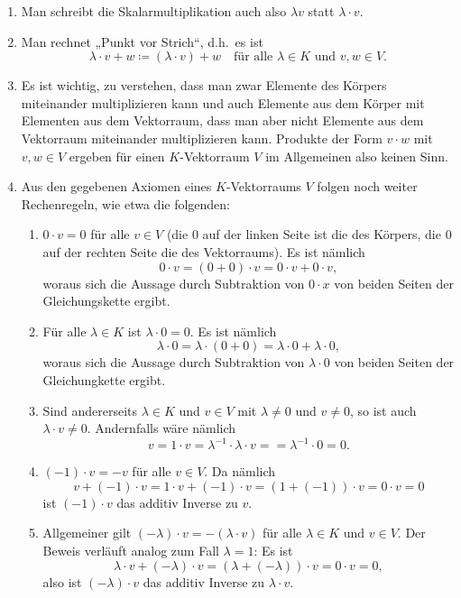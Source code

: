 \begin{bem}
 \begin{enumerate}[leftmargin=*]
  \item
   Man schreibt die Skalarmultiplikation auch also $\lambda v$ statt $\lambda \cdot v$.
  \item
   Man rechnet „Punkt vor Strich“, d.h.\ es ist
   \[
    \lambda \cdot v + w \coloneqq (\lambda \cdot v) + w
    \quad\text{für alle $\lambda \in K$ und $v,w \in V$}.
   \]
  \item
   Es ist wichtig, zu verstehen, dass man zwar Elemente des Körpers miteinander multiplizieren kann und auch Elemente aus dem Körper mit Elementen aus dem Vektorraum, dass man aber nicht Elemente aus dem Vektorraum miteinander multiplizieren kann. Produkte der Form $v \cdot w$ mit $v,w \in V$ ergeben für einen $K$-Vektorraum $V$ im Allgemeinen also keinen Sinn.
  \item
   Aus den gegebenen Axiomen eines $K$-Vektorraums $V$ folgen noch weiter Rechenregeln, wie etwa die folgenden:
   \begin{enumerate}[label=\alph*)]
    \item
     $0 \cdot v = 0$ für alle $v \in V$ (die $0$ auf der linken Seite ist die des Körpers, die $0$ auf der rechten Seite die des Vektorraums). Es ist nämlich
     \[
      0 \cdot v = (0+0) \cdot v = 0 \cdot v + 0 \cdot v,
     \]
     woraus sich die Aussage durch Subtraktion von $0 \cdot x$ von beiden Seiten der Gleichungskette ergibt.
    \item
     Für alle $\lambda \in K$ ist $\lambda \cdot 0 = 0$. Es ist nämlich
     \[
      \lambda \cdot 0
      = \lambda \cdot (0+0)
      = \lambda \cdot 0 + \lambda \cdot 0,
     \]
     woraus sich die Aussage durch Subtraktion von $\lambda \cdot 0$ von beiden Seiten der Gleichungkette ergibt.
    \item
     Sind andererseits $\lambda \in K$ und $v \in V$ mit $\lambda \neq 0$ und $v \neq 0$, so ist auch $\lambda \cdot v \neq 0$. Andernfalls wäre nämlich
     \[
      v
      = 1 \cdot v
      = \lambda^{-1} \cdot \lambda \cdot v = 
      = \lambda^{-1} \cdot 0
      = 0.
     \]
    \item
     $(-1) \cdot v = -v$ für alle $v \in V$. Da nämlich
     \[
      v + (-1) \cdot v = 1 \cdot v + (-1) \cdot v = (1 + (-1)) \cdot v = 0 \cdot v = 0
     \]
     ist $(-1) \cdot v$ das additiv Inverse zu $v$.
    \item
     Allgemeiner gilt $(-\lambda) \cdot v = -(\lambda \cdot v)$ für alle $\lambda \in K$ und $v \in V$. Der Beweis verläuft analog zum Fall $\lambda = 1$: Es ist
     \[
      \lambda \cdot v + (-\lambda) \cdot v
      = (\lambda + (-\lambda)) \cdot v
      = 0 \cdot v
      = 0,
     \]
     also ist $(-\lambda) \cdot v$ das additiv Inverse zu $\lambda \cdot v$.
   \end{enumerate}
 \end{enumerate}
\end{bem}




